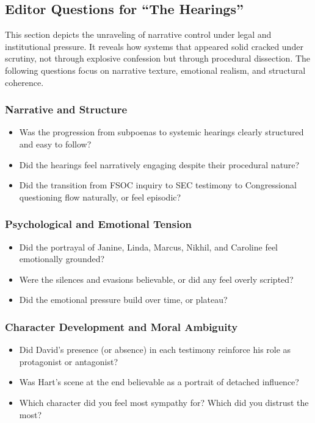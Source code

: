 \subsection{Editor Questions for ``The Hearings''}

This section depicts the unraveling of narrative control under legal and institutional pressure. It reveals how systems 
that appeared solid cracked under scrutiny, not through explosive confession but through procedural dissection. The 
following questions focus on narrative texture, emotional realism, and structural coherence.

\subsubsection{Narrative and Structure}

\begin{itemize}
\item Was the progression from subpoenas to systemic hearings clearly structured and easy to follow?
\item Did the hearings feel narratively engaging despite their procedural nature?
\item Did the transition from FSOC inquiry to SEC testimony to Congressional questioning flow naturally, or feel episodic?
\end{itemize}

\subsubsection{Psychological and Emotional Tension}

\begin{itemize}
\item Did the portrayal of Janine, Linda, Marcus, Nikhil, and Caroline feel emotionally grounded?
\item Were the silences and evasions believable, or did any feel overly scripted?
\item Did the emotional pressure build over time, or plateau?
\end{itemize}

\subsubsection{Character Development and Moral Ambiguity}

\begin{itemize}
\item Did David's presence (or absence) in each testimony reinforce his role as protagonist or antagonist?
\item Was Hart's scene at the end believable as a portrait of detached influence?
\item Which character did you feel most sympathy for? Which did you distrust the most?
\end{itemize}

